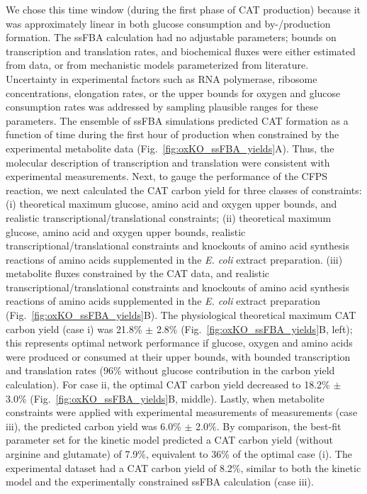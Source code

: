 \documentclass[12pt]{article}
\begin{document}
We chose this time window (during the first phase of CAT production) because it was approximately linear in both glucose consumption and by-/production formation.
The ssFBA calculation had no adjustable parameters; bounds on transcription and translation rates, and biochemical fluxes were either estimated from data, or
from mechanistic models parameterized from literature.
Uncertainty in experimental factors such as RNA polymerase, ribosome concentrations, elongation rates, or the upper bounds for oxygen and glucose consumption rates was addressed
by sampling plausible ranges for these parameters.
The ensemble of ssFBA simulations predicted CAT formation as a function of time during the first hour of production when constrained by the experimental metabolite data (Fig.~\ref{fig:oxKO_ssFBA_yields}A).
Thus, the molecular description of transcription and translation were consistent with experimental measurements.
Next, to gauge the performance of the CFPS reaction, we next calculated the CAT carbon yield for three classes of constraints:
(i) theoretical maximum glucose, amino acid and oxygen upper bounds, and realistic transcriptional/translational constraints;
(ii) theoretical maximum glucose, amino acid and oxygen upper bounds, realistic transcriptional/translational constraints and knockouts of amino acid synthesis reactions of amino acids supplemented in the \textit{E. coli} extract preparation.  
(iii) metabolite fluxes constrained by the CAT data, and realistic transcriptional/translational constraints and knockouts of amino acid synthesis reactions of amino acids supplemented in the \textit{E. coli} extract preparation (Fig.~\ref{fig:oxKO_ssFBA_yields}B).
The physiological theoretical maximum CAT carbon yield (case i) was 21.8\% $\pm$ 2.8\% (Fig.~\ref{fig:oxKO_ssFBA_yields}B, left); this represents optimal network performance if glucose, oxygen and amino acids were produced or consumed at their upper bounds, with bounded transcription and translation rates (96\% without glucose contribution in the carbon yield calculation).
For case ii, the optimal CAT carbon yield decreased to 18.2\% $\pm$ 3.0\% (Fig.~\ref{fig:oxKO_ssFBA_yields}B, middle).
Lastly, when metabolite constraints were applied with experimental measurements of measurements (case iii), the predicted carbon yield was 6.0\% $\pm$ 2.0\%.
By comparison, the best-fit parameter set for the kinetic model predicted a CAT carbon yield (without arginine and glutamate) of 7.9\%, equivalent to 36\% of the optimal case (i).
The experimental dataset had a CAT carbon yield of 8.2\%, similar to both the kinetic model and the experimentally constrained ssFBA calculation (case iii).
\end{document}
